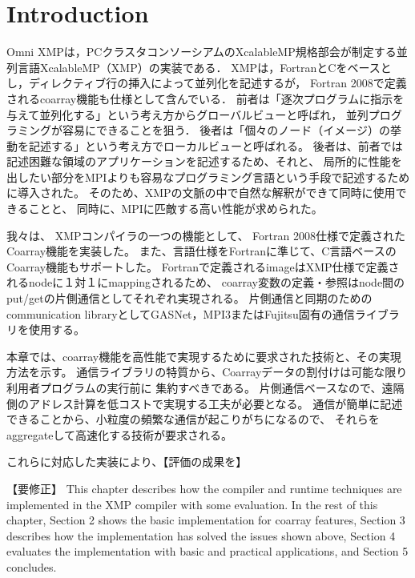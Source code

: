 \section{Introduction}\label{chap:intro}

\setcounter{page}{1}

Omni XMPは，PCクラスタコンソーシアムのXcalableMP規格部会が制定する並列言語XcalableMP（XMP）の実装である．
XMPは，FortranとCをベースとし，ディレクティブ行の挿入によって並列化を記述するが，
Fortran 2008で定義されるcoarray機能も仕様として含んでいる．
前者は「逐次プログラムに指示を与えて並列化する」という考え方からグローバルビューと呼ばれ，
並列プログラミングが容易にできることを狙う．
後者は「個々のノード（イメージ）の挙動を記述する」という考え方でローカルビューと呼ばれる。
後者は、前者では記述困難な領域のアプリケーションを記述するため、それと、
局所的に性能を出したい部分をMPIよりも容易なプログラミング言語という手段で記述するために導入された。
そのため、XMPの文脈の中で自然な解釈ができて同時に使用できることと、
同時に、MPIに匹敵する高い性能が求められた。

我々は、
XMPコンパイラの一つの機能として、
Fortran 2008仕様で定義されたCoarray機能を実装した。
また、言語仕様をFortranに準じて、C言語ベースのCoarray機能もサポートした。
Fortranで定義されるimageはXMP仕様で定義されるnodeに１対１にmappingされるため、
coarray変数の定義・参照はnode間のput/getの片側通信としてそれぞれ実現される。
片側通信と同期のためのcommunication libraryとしてGASNet，MPI3またはFujitsu固有の通信ライブラリを使用する。

本章では、coarray機能を高性能で実現するために要求された技術と、その実現方法を示す。
通信ライブラリの特質から、Coarrayデータの割付けは可能な限り利用者プログラムの実行前に
集約すべきである。
片側通信ベースなので、遠隔側のアドレス計算を低コストで実現する工夫が必要となる。
通信が簡単に記述できることから、小粒度の頻繁な通信が起こりがちになるので、
それらをaggregateして高速化する技術が要求される。

これらに対応した実装により、【評価の成果を】


【要修正】
This chapter describes how the compiler and runtime techniques are 
implemented in the XMP compiler with some evaluation. 
In the rest of this chapter, 
Section 2 shows the basic implementation for coarray features, 
Section 3 describes how the implementation has solved the issues shown above, 
Section 4 evaluates the implementation with basic and practical applications, and 
Section 5 concludes.

